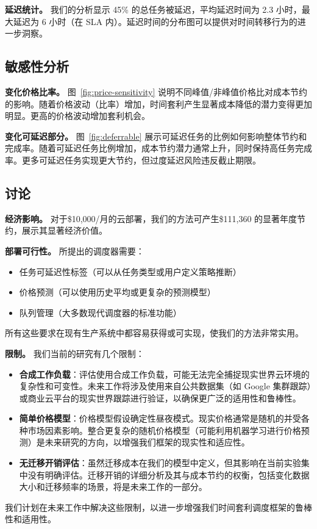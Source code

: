 \documentclass[10pt,a4paper]{article}
\begin{document}
\textbf{延迟统计。} 我们的分析显示 45\% 的总任务被延迟，平均延迟时间为 2.3 小时，最大延迟为 6 小时（在 SLA 内）。延迟时间的分布图可以提供对时间转移行为的进一步洞察。

\subsection{敏感性分析}

\textbf{变化价格比率。} 图~\ref{fig:price-sensitivity} 说明不同峰值/非峰值价格比对成本节约的影响。随着价格波动（比率）增加，时间套利产生显著成本降低的潜力变得更加明显。更高的价格波动增加套利机会。

\textbf{变化可延迟部分。} 图~\ref{fig:deferrable} 展示可延迟任务的比例如何影响整体节约和完成率。随着可延迟任务比例增加，成本节约潜力通常上升，同时保持高任务完成率。更多可延迟任务实现更大节约，但过度延迟风险违反截止期限。

\subsection{讨论}

\textbf{经济影响。} 对于\$10,000/月的云部署，我们的方法可产生\$111,360 的显著年度节约，展示其显著经济价值。

\textbf{部署可行性。} 所提出的调度器需要：
\begin{itemize}
    \item 任务可延迟性标签（可以从任务类型或用户定义策略推断）
    \item 价格预测（可以使用历史平均或更复杂的预测模型）
    \item 队列管理（大多数现代调度器的标准功能）
\end{itemize}
所有这些要求在现有生产系统中都容易获得或可实现，使我们的方法非常实用。

\textbf{限制。} 我们当前的研究有几个限制：
\begin{itemize}
    \item \textbf{合成工作负载}：评估使用合成工作负载，可能无法完全捕捉现实世界云环境的复杂性和可变性。未来工作将涉及使用来自公共数据集（如 Google 集群跟踪）或商业云平台的现实世界跟踪进行验证，以确保更广泛的适用性和鲁棒性。
    \item \textbf{简单价格模型}：价格模型假设确定性昼夜模式。现实价格通常是随机的并受各种市场因素影响。整合更复杂的随机价格模型（可能利用机器学习进行价格预测）是未来研究的方向，以增强我们框架的现实性和适应性。
    \item \textbf{无迁移开销评估}：虽然迁移成本在我们的模型中定义，但其影响在当前实验集中没有明确评估。迁移开销的详细分析及其与成本节约的权衡，包括变化数据大小和迁移频率的场景，将是未来工作的一部分。
\end{itemize}
我们计划在未来工作中解决这些限制，以进一步增强我们时间套利调度框架的鲁棒性和适用性。
\end{document}
